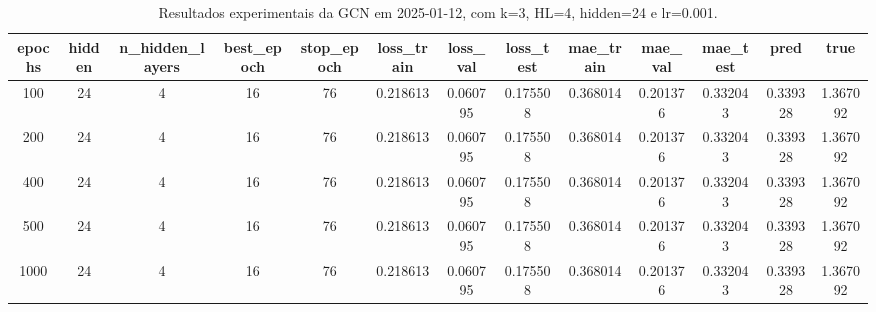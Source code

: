 \begin{table}[h]
\centering
\caption{Resultados experimentais da GCN em 2025-01-12, com k=3, HL=4, hidden=24 e lr=0.001.}
\label{tab:gcn_results_k3_hl4_h24_d20250112}
\begin{tabular}{ccccccccccccc}
\toprule
epochs & hidden & n\_hidden\_layers & best\_epoch & stop\_epoch & loss\_train & loss\_val & loss\_test & mae\_train & mae\_val & mae\_test & pred & true \\
\midrule
100 & 24 & 4 & 16 & 76 & 0.218613 & 0.060795 & 0.175508 & 0.368014 & 0.201376 & 0.332043 & 0.339328 & 1.367092 \\
200 & 24 & 4 & 16 & 76 & 0.218613 & 0.060795 & 0.175508 & 0.368014 & 0.201376 & 0.332043 & 0.339328 & 1.367092 \\
400 & 24 & 4 & 16 & 76 & 0.218613 & 0.060795 & 0.175508 & 0.368014 & 0.201376 & 0.332043 & 0.339328 & 1.367092 \\
500 & 24 & 4 & 16 & 76 & 0.218613 & 0.060795 & 0.175508 & 0.368014 & 0.201376 & 0.332043 & 0.339328 & 1.367092 \\
1000 & 24 & 4 & 16 & 76 & 0.218613 & 0.060795 & 0.175508 & 0.368014 & 0.201376 & 0.332043 & 0.339328 & 1.367092 \\
\bottomrule
\end{tabular}
\end{table}
